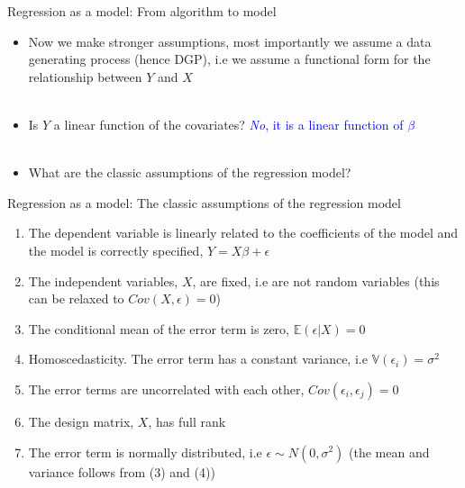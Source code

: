 \documentclass[handout]{beamer}
\begin{document}


\begin{frame}{Regression as a model: From algorithm to model}
\begin{itemize}
\item<+-> Now we make stronger assumptions, most importantly we assume a data generating process (hence DGP), i.e we assume a functional form for the relationship between $Y$ and $X$ \\~\\
\item<+-> Is $Y$ a linear function of the covariates? 
\pause \textcolor{blue}{\textit{No}, it is a linear function of $\beta$} \\~\\
\item<+-> What are the classic assumptions of the regression model?
\end{itemize}
\end{frame}

\begin{frame}{Regression as a model: The classic assumptions of the regression model}
\begin{enumerate}
\item The dependent variable is linearly related to the coefficients of the model and the model is correctly specified,
$Y = X\beta + \epsilon$
\item The independent variables, $X$, are fixed, i.e are not random variables (this can be relaxed to $Cov(X,\epsilon)=0$)
\item The conditional mean of the error term is zero, 
$\mathbb{E}(\epsilon|X)=0$ 
\item Homoscedasticity. The error term has a constant variance, i.e $\mathbb{V}(\epsilon_i)=\sigma^2$ 
\item  The error terms are uncorrelated with each other, $Cov(\epsilon_i, \epsilon_j) = 0$
\item The design matrix, $X$, has full rank
\item The error term is normally distributed, i.e $\epsilon \sim N(0,\sigma^2)$ (the mean and variance follows from (3) and (4))
\end{enumerate}
\end{frame}
\end{document}
